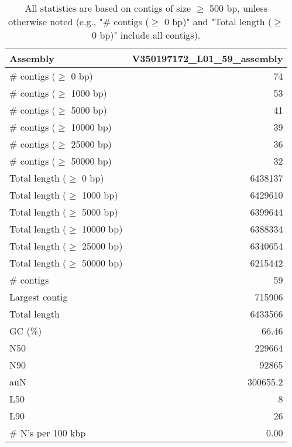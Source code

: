 \documentclass[12pt,a4paper]{article}
\begin{document}
\begin{table}[ht]
\begin{center}
\caption{All statistics are based on contigs of size $\geq$ 500 bp, unless otherwise noted (e.g., "\# contigs ($\geq$ 0 bp)" and "Total length ($\geq$ 0 bp)" include all contigs).}
\begin{tabular}{|l*{1}{|r}|}
\hline
Assembly & V350197172\_L01\_59\_assembly \\ \hline
\# contigs ($\geq$ 0 bp) & 74 \\ \hline
\# contigs ($\geq$ 1000 bp) & 53 \\ \hline
\# contigs ($\geq$ 5000 bp) & 41 \\ \hline
\# contigs ($\geq$ 10000 bp) & 39 \\ \hline
\# contigs ($\geq$ 25000 bp) & 36 \\ \hline
\# contigs ($\geq$ 50000 bp) & 32 \\ \hline
Total length ($\geq$ 0 bp) & 6438137 \\ \hline
Total length ($\geq$ 1000 bp) & 6429610 \\ \hline
Total length ($\geq$ 5000 bp) & 6399644 \\ \hline
Total length ($\geq$ 10000 bp) & 6388334 \\ \hline
Total length ($\geq$ 25000 bp) & 6340654 \\ \hline
Total length ($\geq$ 50000 bp) & 6215442 \\ \hline
\# contigs & 59 \\ \hline
Largest contig & 715906 \\ \hline
Total length & 6433566 \\ \hline
GC (\%) & 66.46 \\ \hline
N50 & 229664 \\ \hline
N90 & 92865 \\ \hline
auN & 300655.2 \\ \hline
L50 & 8 \\ \hline
L90 & 26 \\ \hline
\# N's per 100 kbp & 0.00 \\ \hline
\end{tabular}
\end{center}
\end{table}
\end{document}
